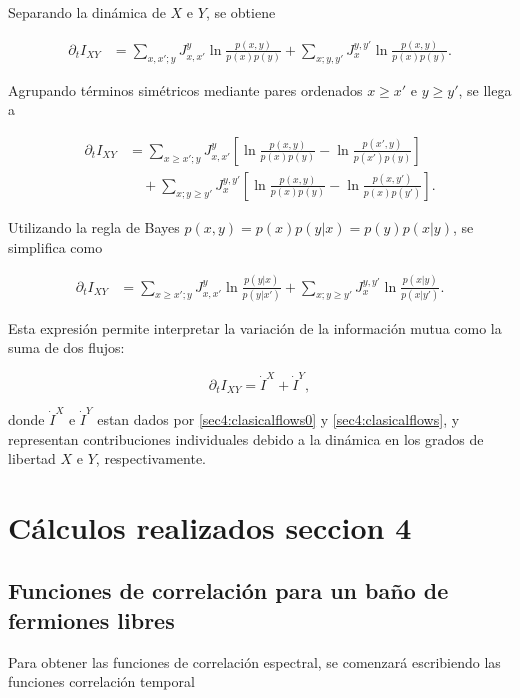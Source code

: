 \begin{appendixs}
Separando la dinámica de \(X\) e \(Y\), se obtiene

\begin{align*}
    \partial_{t} I_{XY} &= \sum_{x,x';y} J_{x,x'}^{y} \ln \frac{p(x,y)}{p(x)p(y)} 
    + \sum_{x;y,y'} J_{x}^{y,y'} \ln \frac{p(x,y)}{p(x)p(y)}.
\end{align*}

Agrupando términos simétricos mediante pares ordenados \(x \geq x'\) e \(y \geq y'\), se llega a

\begin{align*}
    \partial_{t} I_{XY} &= \sum_{x \geq x';y} J_{x,x'}^{y} \left[ \ln \frac{p(x,y)}{p(x)p(y)} - \ln \frac{p(x',y)}{p(x')p(y)} \right] \nonumber \\
    &\quad + \sum_{x;y \geq y'} J_{x}^{y,y'} \left[ \ln \frac{p(x,y)}{p(x)p(y)} - \ln \frac{p(x,y')}{p(x)p(y')} \right].
\end{align*}

Utilizando la regla de Bayes \(p(x,y) = p(x)p(y|x) = p(y)p(x|y)\), se simplifica como

\begin{align*}
    \partial_{t} I_{XY} 
    &= \sum_{x \geq x';y} J_{x,x'}^{y} \ln \frac{p(y|x)}{p(y|x')} 
     + \sum_{x;y \geq y'} J_{x}^{y,y'} \ln \frac{p(x|y)}{p(x|y')}.
\end{align*}

Esta expresión permite interpretar la variación de la información mutua como la suma de dos flujos:

\begin{equation*}
    \partial_{t} I_{XY} = \dot{I}^{X} + \dot{I}^{Y},
\end{equation*}

donde \(\dot{I}^{X}\) e \(\dot{I}^{Y}\) estan dados por \ref{sec4:clasicalflows0} y \ref{sec4:clasicalflows}, y representan contribuciones individuales debido a la dinámica en los grados de libertad \(X\) e \(Y\), respectivamente.


    \label{apendix4:secondlaw}


\newpage

\section{Cálculos realizados seccion 4}
\subsection{Funciones de correlación para un baño de fermiones libres}
Para obtener las funciones de correlación espectral, se comenzará escribiendo las funciones correlación temporal 


\end{appendixs}
